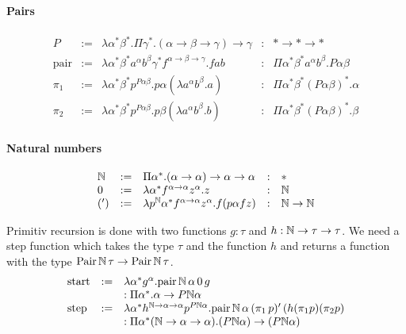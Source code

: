 \paragraph{Pairs}

$$
\begin{array}{lllll}
  P
  &:=& \lambda \alpha^* \beta^*
       . \Pi \gamma^*
       . (\alpha\to\beta\to\gamma) \to \gamma
  &:& * \to * \to *
  \\
  \text{pair}
  &:=& \lambda
       \alpha^*
       \beta^*
       a^\alpha
       b^\beta
       \gamma^*
       f^{\alpha\to\beta\to\gamma}
       . f a b
  &:& \Pi \alpha^* \beta^* a^\alpha b^\beta . P \alpha \beta
  \\
  \pi_1
  &:=& \lambda
       \alpha^*
       \beta^*
       p^{P\alpha\beta}
       . p \alpha (\lambda a^\alpha b^\beta. a)
  &:& \Pi \alpha^* \beta^* (P\alpha\beta)^* . \alpha
  \\
  \pi_2
  &:=& \lambda
       \alpha^*
       \beta^*
       p^{P\alpha\beta}
       . p \beta (\lambda a^\alpha b^\beta. b)
  &:& \Pi \alpha^* \beta^* (P\alpha\beta)^* . \beta
\end{array}
$$



\paragraph{Natural numbers}
$$
\begin{array}{lllll}
  \mathbb{N}
  &:= & \Pi \alpha^* . (\alpha \to \alpha) \to \alpha \to \alpha
  &:& *
  \\
  0
  &:=& \lambda \alpha^* f^{\alpha\to\alpha} z^\alpha. z
  &:& \mathbb{N}
  \\
  (')
  &:=& \lambda p^{\mathbb{N}} \alpha^* f^{\alpha\to\alpha} z^\alpha . f (p \alpha f z)
  &:& \mathbb{N}\to\mathbb{N}
\end{array}
$$

Primitiv recursion is done with two functions $g:\tau$ and
$h:\mathbb{N} \to \tau \to \tau$. We need a step function which takes the type
$\tau$ and the function $h$ and returns a function with the type
$\text{Pair}\,\mathbb{N}\,\tau \to \text{Pair}\,\mathbb{N}\,\tau$.
$$
\begin{array}{lll}
  \text{start}
  &:=& \lambda
       \alpha^*
       g^\alpha
       . \text{pair}\,\mathbb{N}\,\alpha\,0\,g
  \\
  & &: \Pi \alpha^*. \alpha \to P\mathbb{N}\alpha
  \\
  \text{step}
  &:=& \lambda
       \alpha^*
       h^{\mathbb{N}\to\alpha\to\alpha}
       p^{P\mathbb{N}\alpha}
       . \text{pair}\,\mathbb{N}\,\alpha\,
       (\pi_1\,p)'\,
       (h (\pi_1 p) (\pi_2 p)
  \\
  & &: \Pi \alpha^* (\mathbb{N}\to\alpha\to\alpha)
      . (P\mathbb{N}\alpha)\to (P\mathbb{N}\alpha)
\end{array}
$$


